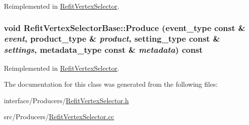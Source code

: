 Reimplemented in \hyperlink{classRefitVertexSelector_a3d8920d82d12c7de736a798b683b6d7f}{RefitVertexSelector}.\hypertarget{classRefitVertexSelectorBase_a77253bf070f364ed29d8f040a2dd1629}{
\subsubsection[{Produce}]{\setlength{\rightskip}{0pt plus 5cm}void RefitVertexSelectorBase::Produce (event\_\-type const \& {\em event}, \/  product\_\-type \& {\em product}, \/  setting\_\-type const \& {\em settings}, \/  metadata\_\-type const \& {\em metadata}) const}}
\label{classRefitVertexSelectorBase_a77253bf070f364ed29d8f040a2dd1629}


Reimplemented in \hyperlink{classRefitVertexSelector_a2fa81d07f81c40a39d5dffc4d19e9fb8}{RefitVertexSelector}.

The documentation for this class was generated from the following files:\begin{DoxyCompactItemize}
\item 
interface/Producers/\hyperlink{RefitVertexSelector_8h}{RefitVertexSelector.h}\item 
src/Producers/\hyperlink{RefitVertexSelector_8cc}{RefitVertexSelector.cc}\end{DoxyCompactItemize}
